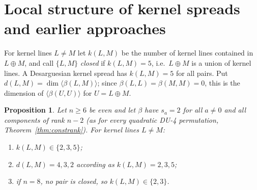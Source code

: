 \documentclass[11pt]{article}
\newtheorem{proposition}[theorem]{Proposition}
\theoremstyle{definition}
\begin{document}
\section{Local structure of kernel spreads and earlier approaches}\label{sec:local}
For kernel lines $L\neq M$ let $k(L,M)$ be the number of kernel lines contained in $L\oplus M$,
and call $\{L,M\}$ \emph{closed} if $k(L,M)=5$, i.e.\ $L\oplus M$ is a union of kernel lines. A
Desarguesian kernel spread has $k(L,M)=5$ for all pairs. Put $d(L,M)=\dim\langle\beta(L,M)\rangle$;
since $\beta(L,L)=\beta(M,M)=0$, this is the dimension of $\langle\beta(U,U)\rangle$ for $U=L\oplus M$.
\begin{proposition}\label{prop:local}
Let $n\ge 6$ be even and let $\beta$ have $s_a=2$ for all $a\neq0$ and all components of rank
$n-2$ (as for every quadratic DU-4 permutation, Theorem~\ref{thm:constrank}). For kernel lines
$L\neq M$:
\begin{enumerate}
\item[(a)] $k(L,M)\in\{2,3,5\}$;
\item[(b)] $d(L,M)=4,3,2$ according as $k(L,M)=2,3,5$;
\item[(c)] if $n=8$, no pair is closed, so $k(L,M)\in\{2,3\}$.
\end{enumerate}
\end{proposition}
\end{document}
